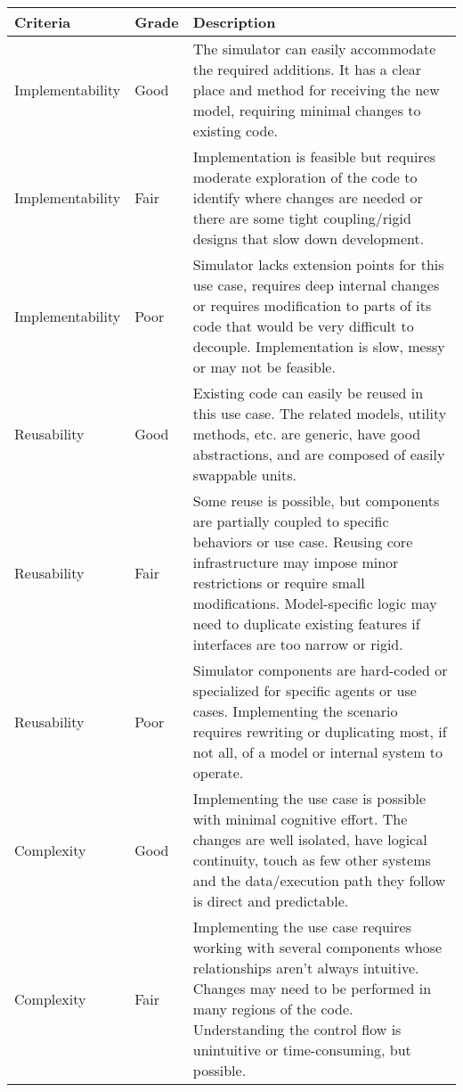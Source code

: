\documentclass[twoside, 11pt]{article}
\begin{document}
\begin{center}
  \begin{table}[h!]
    \begin{tabularx}{\textwidth}{ | p{2.9cm} | l | X | } 
      \hline
      Criteria & Grade & Description \\ 
      \hline
      Implementability & Good & 
      The simulator can easily accommodate the required additions. It has a clear place and method for receiving the new model, requiring minimal changes to existing code.
      \\ 
      \hline
      Implementability & Fair & 
      Implementation is feasible but requires moderate exploration of the code to identify where changes are needed or there are some tight coupling/rigid designs that slow down development.
      \\ 
      \hline
      Implementability & Poor & 
      Simulator lacks extension points for this use case, requires deep internal changes or requires modification to parts of its code that would be very difficult to decouple. Implementation is slow, messy or may not be feasible.
      \\
      \hline
      \hline
      Reusability & Good & 
      Existing code can easily be reused in this use case. The related models, utility methods, etc. are  generic, have good abstractions, and are composed of easily swappable units.
      \\ 
      \hline
      Reusability & Fair & 
      Some reuse is possible, but components are partially coupled to specific behaviors or use case. Reusing core infrastructure may impose minor restrictions or require small modifications. Model-specific logic may need to duplicate existing features if interfaces are too narrow or rigid.
      \\ 
      \hline
      Reusability & Poor & 
      Simulator components are hard-coded or specialized for specific agents or use cases. Implementing the scenario requires rewriting or duplicating most, if not all, of a model or internal system to operate. 
      \\ 
      \hline
      \hline
      Complexity & Good & 
      Implementing the use case is possible with minimal cognitive effort. The changes are well isolated, have logical continuity, touch as few other systems and the data/execution path they follow is direct and predictable.
      \\ 
      \hline
      Complexity & Fair & 
      Implementing the use case requires working with several components whose relationships aren't always intuitive. Changes may need to be performed in many regions of the code. Understanding the control flow is unintuitive or time-consuming, but possible.

\end{tabularx}
\end{table}
\end{center}
\end{document}
